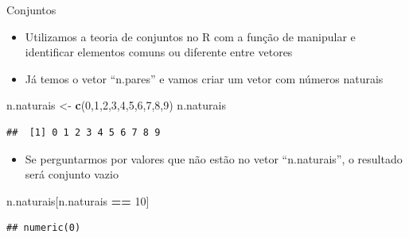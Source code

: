 \documentclass[
  10pt,
  ignorenonframetext,
]{beamer}
\newenvironment{Shaded}{\begin{snugshade}}{\end{snugshade}}
\newcommand{\DecValTok}[1]{\textcolor[rgb]{0.00,0.00,0.81}{#1}}
\newcommand{\KeywordTok}[1]{\textcolor[rgb]{0.13,0.29,0.53}{\textbf{#1}}}
\newcommand{\NormalTok}[1]{#1}
\newcommand{\OperatorTok}[1]{\textcolor[rgb]{0.81,0.36,0.00}{\textbf{#1}}}
\newcommand{\StringTok}[1]{\textcolor[rgb]{0.31,0.60,0.02}{#1}}
\providecommand{\tightlist}{%
  \setlength{\itemsep}{0pt}\setlength{\parskip}{0pt}}
\begin{document}
\begin{frame}[fragile]{Conjuntos}
\protect\hypertarget{conjuntos}{}
\begin{itemize}
\tightlist
\item
  Utilizamos a teoria de conjuntos no R com a função de manipular e
  identificar elementos comuns ou diferente entre vetores
\item
  Já temos o vetor ``n.pares'' e vamos criar um vetor com números
  naturais
\end{itemize}

\begin{Shaded}
\begin{Highlighting}[]
\NormalTok{n.naturais \textless{}{-}}\StringTok{ }\KeywordTok{c}\NormalTok{(}\DecValTok{0}\NormalTok{,}\DecValTok{1}\NormalTok{,}\DecValTok{2}\NormalTok{,}\DecValTok{3}\NormalTok{,}\DecValTok{4}\NormalTok{,}\DecValTok{5}\NormalTok{,}\DecValTok{6}\NormalTok{,}\DecValTok{7}\NormalTok{,}\DecValTok{8}\NormalTok{,}\DecValTok{9}\NormalTok{)}
\NormalTok{n.naturais}
\end{Highlighting}
\end{Shaded}

\begin{verbatim}
##  [1] 0 1 2 3 4 5 6 7 8 9
\end{verbatim}

\begin{itemize}
\tightlist
\item
  Se perguntarmos por valores que não estão no vetor ``n.naturais'', o
  resultado será conjunto vazio
\end{itemize}

\begin{Shaded}
\begin{Highlighting}[]
\NormalTok{n.naturais[n.naturais }\OperatorTok{==}\StringTok{ }\DecValTok{10}\NormalTok{]}
\end{Highlighting}
\end{Shaded}

\begin{verbatim}
## numeric(0)
\end{verbatim}
\end{frame}
\end{document}
